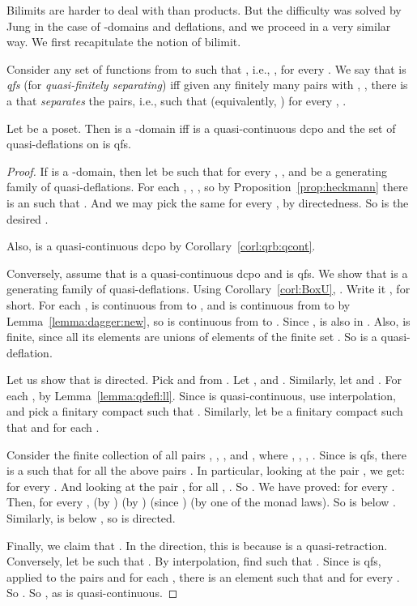 \documentclass{LMCS}
\begin{document}
Bilimits are harder to deal with than products.  But the difficulty
was solved by Jung \cite[Section~4.1]{Jung:CCC} in the case of
-domains and deflations, and we proceed in a very similar way.
We first recapitulate the notion of bilimit.

Consider any set  of functions  from  to  such
that , i.e., , for every .  We say that  is {\em qfs\/} (for {\em quasi-finitely
  separating\/}) iff given any finitely many pairs  with , ,
there is a  that {\em separates\/} the pairs, i.e., such
that  (equivalently,
) for every , .
\begin{prop}
  \label{prop:qfs}
  Let  be a poset.  Then  is a -domain iff  is a
  quasi-continuous dcpo and the set  of quasi-deflations on  is
  qfs.
\end{prop}
\begin{proof}
  If  is a -domain, then let  be such that  for every , , and  be a generating family of
  quasi-deflations.  For each , , , so by Proposition~\ref{prop:heckmann} there is an 
  such that .  And we may pick the same  for every , by directedness.
  So  is the desired .

  Also,  is a quasi-continuous dcpo by
  Corollary~\ref{corl:qrb:qcont}.

  Conversely, assume that  is a quasi-continuous dcpo and  is
  qfs.  We show that  is a generating family of quasi-deflations.  Using
  Corollary~\ref{corl:BoxU}, .  Write
  it , for short.  For each ,  is
  continuous from  to , and  is
  continuous from  to  by
  Lemma~\ref{lemma:dagger:new}, so  is
  continuous from  to .  Since , 
  is also in .  Also,  is finite, since all its elements are unions of
  elements of the finite set .  So  is a quasi-deflation.

  Let us show that  is directed.  Pick  and 
  from .  Let , and
  .  Similarly, let  and .  For
  each ,  by Lemma~\ref{lemma:qdefl:ll}.
  Since  is quasi-continuous, use interpolation, and pick a
  finitary compact  such that .  Similarly, let  be a finitary compact such
  that  and 
  for each .

  Consider the finite collection of all pairs ,
  , , and ,
  where , , , .  Since
   is qfs, there is a  such that  for all the above pairs .  In
  particular, looking at the pair , we get:   for every .  And looking at the
  pair ,  for all , .  So .  We have proved:   for every .  Then, for every ,
   (by )
   (by
  )  (since )  (by one of the monad laws).  So
   is below .
  Similarly,  is below
  , so  is directed.

  Finally, we claim that .  In the  direction, this is
  because  is a quasi-retraction.
  Conversely, let  be such that .
  By interpolation, find  such that .  Since  is qfs, applied to the pairs  and  for each , there is an element
   such that  and  for every .  So .  So , as  is quasi-continuous.
\end{proof}
\end{document}
